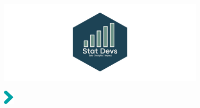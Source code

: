 \makeatletter
\let\inserttitle\@title
\makeatother
\makeatletter
\let\insertauthor\@author
\makeatother
\makeatletter
\let\insertdate\@date
\makeatother


\vspace*{-4.5cm}


\vspace*{14cm}

\hspace{-2.7cm}

\hspace{12cm}
\includegraphics[width=10cm]{quarto-statdevs-template/images/Final-Logo.png}\par
\vspace*{-5cm}

\hspace{-2.8cm}

\vspace*{1cm}

\hspace{-1cm}
\setlength{\parindent}{0cm}
\includegraphics[width=0.5cm]{quarto-statdevs-template/images/fleche-titre.png}\hspace{0.3cm}\textcolor{statdevs}{\sffamily\Huge\bfseries \inserttitle}\par\bigskip

\hspace{-1cm}\textcolor{statdevs}{\sffamily \insertdate}\par %
 
\hspace{-1cm}\textcolor{statdevsdark}{\sffamily \Large\bfseries\insertauthor}\par %


\restoregeometry

